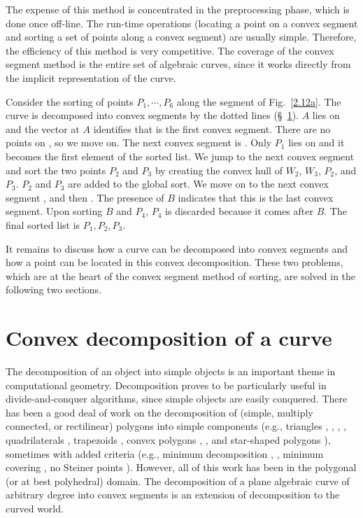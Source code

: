 \vspace{.2in}

The expense of this method is concentrated in the preprocessing phase, which
is done once off-line. 
The run-time operations (locating a point on a convex segment and
sorting a set of points along a convex segment) are usually simple.
Therefore, the efficiency of this method is very competitive.
The coverage of the convex segment method is the entire set of algebraic 
curves,
since it works directly from the implicit representation of the curve.


\begin{example}
{\rm
Consider the sorting of points $P_{1}, \cdots, P_{6}$ 
along the segment  of Fig.~\ref{2.12a}.
The curve is decomposed into convex segments by the dotted lines 
(\S~\ref{s-dec}).
$A$ lies on  and
the vector at $A$ identifies that  is the first convex segment.
There are no points on , so we move on.
The next convex segment is \arc{\wo\wt}.
Only $P_{1}$ lies on \arc{\wo\wt} and it becomes the first element of the 
sorted list.
We jump to the next convex segment  and
sort the two points $P_{2}$ and $P_{3}$ 
by creating the convex hull of $W_{2}$, $W_{3}$, $P_{2}$, and $P_{3}$.
$P_{2}$ and $P_{3}$ are added to the global sort.
We move on to the next convex segment , and then 
.
The presence of $B$ indicates that this is the last convex segment.
Upon sorting $B$ and $P_{4}$, $P_{4}$ is discarded because it comes 
after $B$.
The final sorted list is $P_{1},P_{2},P_{3}$.
}
\end{example}

It remains to discuss how a curve can be decomposed into convex segments and
how a point can be located in this convex decomposition.
These two problems, which are at the heart of the convex segment method 
of sorting, are solved in the following two sections.

\section{Convex decomposition of a curve}
\label{s-dec}
%
The decomposition of an object into simple objects is an important theme
in computational geometry.
Decomposition proves to be particularly useful in divide-and-conquer 
algorithms, 
since simple objects are easily conquered.
There has been a good deal of work on the decomposition of 
(simple, multiply connected, or rectilinear) polygons into simple components
(e.g., triangles \cite{CI}, \cite{G}, \cite{H}, \cite{T}, 
quadrilaterals \cite{S}, 
trapezoids \cite{As}, convex polygons  \cite{cd}, \cite{tm}, and 
star-shaped 
polygons \cite{Av}), sometimes with added criteria (e.g., 
minimum decomposition 
\cite{cd}, \cite{keil}, minimum covering \cite{O}, no Steiner points 
\cite{keil}).
However, all of this work has been in the polygonal (or at best polyhedral) 
domain.
The decomposition of a plane algebraic curve of arbitrary degree into 
convex 
segments is an extension of decomposition to the curved world.

